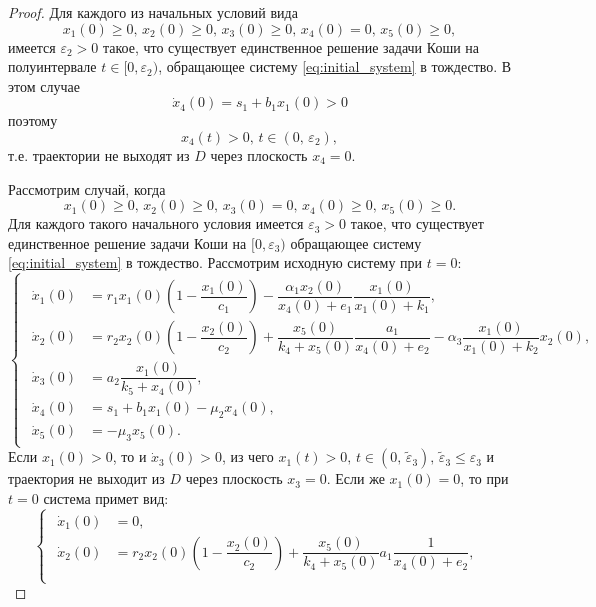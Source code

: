 \documentclass[14pt,a4paper]{extarticle}
\begin{document}
\begin{proof}
		Для каждого из начальных условий вида
		\begin{equation*}
			x_1(0)\ge0,\, x_2(0)\ge0,\, x_3(0)\ge0,\, x_4(0)=0,\, x_5(0)\ge0,
		\end{equation*}
		имеется $\varepsilon_2>0$ такое, что существует единственное решение задачи Коши на полуинтервале $t\in[0,\varepsilon_2)$, обращающее систему \ref{eq:initial_system} в тождество. В этом случае 
		\[\dot{x}_4(0)=s_1+b_1x_1(0)>0\]
		поэтому 
		\[x_4(t)>0,\, t\in(0,\,\varepsilon_2),\]
		т.е. траектории не выходят из $D$ через плоскость $x_4=0$.
		
		Рассмотрим случай, когда
		\begin{equation}\label{eq:conds_3}
			x_1(0)\ge0,\, x_2(0)\ge0,\, x_3(0)=0,\, x_4(0)\ge0,\, x_5(0)\ge0.
		\end{equation}
		Для каждого такого начального условия имеется $\varepsilon_3>0$ такое, что существует единственное решение задачи Коши на $[0,\varepsilon_3)$ обращающее систему \ref{eq:initial_system} в тождество. Рассмотрим исходную систему при $t=0$:
		\begin{equation*}
			\begin{cases}
				\begin{aligned}
					\dot{x}_1(0) &= r_1x_1(0)\left(1-\dfrac{x_1(0)}{c_1}\right)-\dfrac{\alpha_1x_2(0)}{x_4(0)+e_1}\dfrac{x_1(0)}{x_1(0)+k_1},\\
					\dot{x}_2(0) &= r_2x_2(0)\left(1-\dfrac{x_2(0)}{c_2}\right)+\dfrac{x_5(0)}{k_4+x_5(0)}\dfrac{a_1}{x_4(0)+e_2}-\alpha_3\dfrac{x_1(0)}{x_1(0)+k_2}x_2(0),\\
					\dot{x}_3(0) &= a_2\dfrac{x_1(0)}{k_5+x_4(0)},\\
					\dot{x}_4(0) &= s_1 + b_1x_1(0) - \mu_2x_4(0),\\
					\dot{x}_5(0) &= -\mu_3x_5(0).
				\end{aligned}
			\end{cases}
		\end{equation*}
		Если $x_1(0)>0$, то и $\dot{x}_3(0)>0$, из чего $x_1(t)>0,\, t\in(0,\, \tilde{\varepsilon}_3),\,\tilde{\varepsilon}_3\le\varepsilon_3$ и траектория не выходит из $D$ через плоскость $x_3=0$. Если же $x_1(0)=0$, то при $t=0$ система примет вид:
		\begin{equation*}
			\begin{cases}
				\begin{aligned}
					\dot{x}_1(0) &= 0,\\
					\dot{x}_2(0) &= r_2x_2(0)\left(1-\dfrac{x_2(0)}{c_2}\right)+\dfrac{x_5(0)}{k_4+x_5(0)}a_1\dfrac{1}{x_4(0)+e_2},\\

\end{aligned}
\end{cases}
\end{equation*}
\end{proof}
\end{document}
